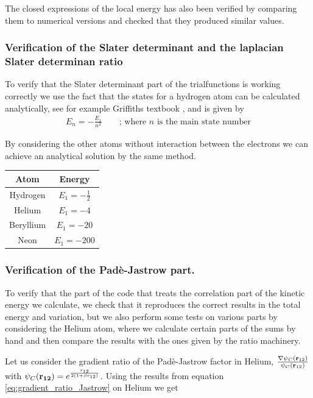 \documentclass[11pt]{article}
\begin{document}
			The closed expressions of the local energy has also been verified by comparing them to numerical versions and checked that they produced similar values.

		\subsubsection{Verification of the Slater determinant and the laplacian Slater determinan ratio}
			To verify that the Slater determinant part of the trialfunctions is working correctly we use the fact that the states for a hydrogen atom can be calculated analytically, see for example Griffiths textbook  \cite{griffiths2005introduction}, and is given by
			\begin{align}
				E_n = -\frac{E_1}{n^2}  \qquad \text{; where } n  \text{ is the main state number}
			\end{align}

			By considering the other atoms without interaction between the electrons we can achieve an analytical solution by the same method.
			\begin{center}
				\begin{tabular}{| c | c |}
				\bottomrule
				Atom & Energy
				\\ \hline
				Hydrogen 	& \( E_1 = -\frac{1}{2} \)
				\\ \hline
				Helium 		& \( E_1 = -4\)
				\\ \hline Beryllium		& \( E_1 = -20 \)
				\\ \hline Neon		& \( E_1 = -200 \)
				\\ \toprule
				\end{tabular}
			\end{center}

		\subsubsection{Verification of the Padè-Jastrow part.}
			To verify that the part of the code that treats the correlation part of the kinetic energy we calculate, we check that it reproduces the correct results in the total energy and variation, but we also perform some tests on various parts by considering the Helium atom, where we calculate certain parts of the sums by hand and then compare the results with the ones given by the ratio machinery.

			Let us consider the gradient ratio of the Padè-Jastrow factor in Helium, \(\frac{\nabla\psi_C(\vb{r}_{12})}{\psi_C(\vb{r}_{12})}\) with \(\psi_C(\vb{r_{12}}) = e^{\frac{r_{12}}{2(1+\beta r_{12})}}\). Using the results from equation \eqref{eq:gradient_ratio_Jastrow} on Helium we get
\end{document}
